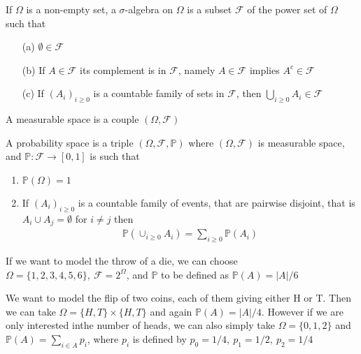 \begin{defn}
	If $\Omega$ is a non-empty set, a $\sigma$-algebra on $\Omega$ is a subset $\mathcal{F}$ of the power set of $\Omega$ such that
	\begin{enumerate}
	\item[(a)] $\emptyset \in \mathcal{F}$
	\item[(b)] If $A \in \mathcal{F}$ its complement is in $\mathcal{F}$, namely $A \in \mathcal{F}$ implies $A^c \in \mathcal{F}$
	\item[(c)] If $(A_i)_{i \geqslant 0}$ is a countable family of sets in $\mathcal{F}$, then $\bigcup_{i \geqslant 0} A_{i} \in \mathcal{F}$
	\end{enumerate}
\end{defn}

\begin{defn}
	A measurable space is a couple $(\Omega, \mathcal{F})$
\end{defn}

\begin{defn}
	A probability space is a triple $(\Omega, \mathcal{F}, \mathbb{P})$ where $(\Omega, \mathcal{F})$ is measurable space, and $\mathbb{P}: \mathcal{F} \to [0,1]$ is such that
	\begin{enumerate}
	\item $\mathbb{P}(\Omega) = 1$
	\item If $(A_i)_{i \geqslant 0}$ is a countable family of events, that are pairwise disjoint, that is $A_i \cup A_j = \emptyset$ for $i \ne j$ then \begin{gather*}
	\mathbb{P} (\cup_{i \geqslant 0} A_i) = \sum\limits_{i \geqslant 0} \mathbb{P}(A_i)
	\end{gather*}
	\end{enumerate}
\end{defn}

\begin{exmp}
	If we want to model the throw of a die, we can choose $\Omega = \{1,2,3,4,5,6\},\ \mathcal{F} = 2^{\Omega}$, and $\mathbb{P}$ to be defined as $\mathbb{P}(A) = |A|/6$
\end{exmp}

\begin{exmp}
	We want to model the flip of two coins, each of them giving either H or T. Then we can take $\Omega = \{H, T\} \times \{H, T\}$ and again $\mathbb{P}(A) = |A|/4$. However if we are only interested inthe number of heads, we can also simply take $\Omega = \{0,1,2\}$ and $\mathbb{P}(A) = \sum_{i\in A} p_i$, where $p_i$ is defined by $p_0 = 1/4,\ p_1 = 1/2,\ p_2 = 1/4$
\end{exmp}

